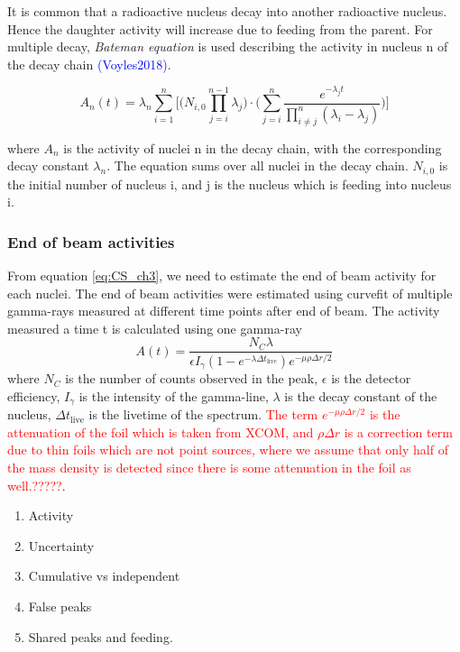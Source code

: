 \documentclass[a4paper,11pt,twoside]{book}
\begin{document}
\noindent It is common that a radioactive nucleus decay into another radioactive nucleus. Hence the daughter activity will increase due to feeding from the parent. For multiple decay, \textit{Bateman equation} is used describing the activity in nucleus n of the decay chain \textcolor{blue}{(Voyles2018)}.

\begin{equation} \label{eq:Bateman}
    A_n(t) = \lambda_n \sum_{i=1}^{n} \Big[ \Big(N_{i,0} \prod_{j=i}^{n-1}\lambda_j\Big) \cdot \Big( \sum_{j=i}^{n}\frac{e^{-\lambda_j t}}{\prod_{i\neq j}^{n}(\lambda_i - \lambda_j) }\Big) \Big]
\end{equation}

\noindent 
where $A_n$ is the activity of nuclei n in the decay chain, with the corresponding decay constant $\lambda_n$. The equation sums over all nuclei in the decay chain. $N_{i,0}$ is the initial number of nucleus i, and j is the nucleus which is feeding into nucleus i.




\subsubsection{End of beam activities}
From equation \ref{eq:CS_ch3}, we need to estimate the end of beam activity for each nuclei. The end of beam activities were estimated using curvefit of multiple gamma-rays measured at different time points after end of beam. The activity measured a time t is calculated using one gamma-ray
\begin{equation} \label{eq:activity_spectra}
    A(t)=\frac{N_C \lambda}{\epsilon I_\gamma (1-e^{-\lambda \Delta t_\text{live}})e^{-\mu\rho\Delta r/2}}
\end{equation}
\noindent
where $N_C$ is the number of counts observed in the peak, $\epsilon$ is the detector efficiency, $I_\gamma$ is the intensity of the gamma-line, $\lambda$ is the decay constant of the nucleus, $\Delta t_\text{live}$ is the livetime of the spectrum. \textcolor{red}{The term $e^{-\mu \rho \Delta r/2}$ is the attenuation of the foil which is taken from \textcolor{red}{XCOM}, and $\rho\Delta r$ is a correction term due to thin foils which are not point sources, where we assume that only half of the mass density is detected since there is some attenuation in the foil as well.?????}.\\

\noindent 

\begin{enumerate}
    \item Activity 
    \item Uncertainty 
    \item Cumulative vs independent 
    \item False peaks
    \item Shared peaks and feeding. 
\end{enumerate}
\end{document}
